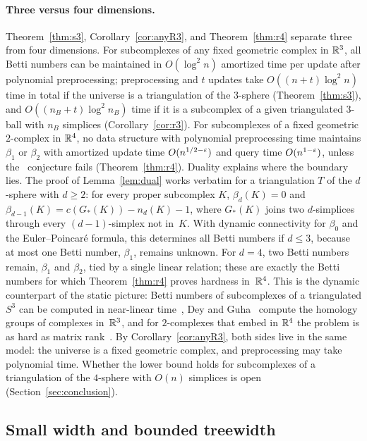 \paragraph{Three versus four dimensions.}
Theorem~\ref{thm:s3}, Corollary~\ref{cor:anyR3}, and Theorem~\ref{thm:r4} separate three from four dimensions.
For subcomplexes of any fixed geometric complex in $\mathbb{R}^3$, all Betti numbers can be maintained in $O(\log^2 n)$ amortized time per update after polynomial preprocessing; preprocessing and $t$ updates take $O((n+t)\log^2 n)$ time in total if the universe is a triangulation of the $3$-sphere (Theorem~\ref{thm:s3}), and $O((n_B+t)\log^2 n_B)$ time if it is a subcomplex of a given triangulated $3$-ball with $n_B$ simplices (Corollary~\ref{cor:r3}).
For subcomplexes of a fixed geometric $2$-complex in $\mathbb{R}^4$, no data structure with polynomial preprocessing time maintains $\beta_1$ or $\beta_2$ with amortized update time $O(n^{1/2-\varepsilon})$ and query time $O(n^{1-\varepsilon})$, unless the \OMv\ conjecture fails (Theorem~\ref{thm:r4}).
Duality explains where the boundary lies.
The proof of Lemma~\ref{lem:dual} works verbatim for a triangulation $T$ of the $d$-sphere with $d\ge2$: for every proper subcomplex $K$, $\beta_d(K)=0$ and $\beta_{d-1}(K)=c(G_\ast(K))-n_d(K)-1$, where $G_\ast(K)$ joins two $d$-simplices through every $(d-1)$-simplex not in~$K$.
With dynamic connectivity for $\beta_0$ and the Euler--Poincar\'e formula, this determines all Betti numbers if $d\le3$, because at most one Betti number, $\beta_1$, remains unknown.
For $d=4$, two Betti numbers remain, $\beta_1$ and $\beta_2$, tied by a single linear relation; these are exactly the Betti numbers for which Theorem~\ref{thm:r4} proves hardness in~$\mathbb{R}^4$.
This is the dynamic counterpart of the static picture: Betti numbers of subcomplexes of a triangulated $S^3$ can be computed in near-linear time~\cite{DE95}, Dey and Guha~\cite{DG98} compute the homology groups of complexes in~$\mathbb{R}^3$, and for $2$-complexes that embed in $\mathbb{R}^4$ the problem is as hard as matrix rank~\cite{EP14}.
By Corollary~\ref{cor:anyR3}, both sides live in the same model: the universe is a fixed geometric complex, and preprocessing may take polynomial time.
Whether the lower bound holds for subcomplexes of a triangulation of the $4$-sphere with $O(n)$ simplices is open (Section~\ref{sec:conclusion}).

\subsection{Small width and bounded treewidth}\label{sec:easy-width}

